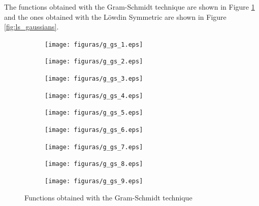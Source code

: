 The functions obtained with the Gram-Schmidt technique are shown in Figure \ref{fig:gs_gaussians} and the ones obtained with the Löwdin Symmetric are shown in Figure \ref{fig:ls_gaussians}.
\begin{figure}[H]
    \centering
    \begin{subfigure}[b]{0.3\linewidth}
        \texttt{[image: figuras/g\_gs\_1.eps]}
    \end{subfigure}
    \begin{subfigure}[b]{0.3\linewidth}
        \texttt{[image: figuras/g\_gs\_2.eps]}
    \end{subfigure}
    \begin{subfigure}[b]{0.3\linewidth}
        \texttt{[image: figuras/g\_gs\_3.eps]}
    \end{subfigure}
    \begin{subfigure}[b]{0.3\linewidth}
        \texttt{[image: figuras/g\_gs\_4.eps]}
    \end{subfigure}
    \begin{subfigure}[b]{0.3\linewidth}
        \texttt{[image: figuras/g\_gs\_5.eps]}
    \end{subfigure}
    \begin{subfigure}[b]{0.3\linewidth}
        \texttt{[image: figuras/g\_gs\_6.eps]}
    \end{subfigure}
    \begin{subfigure}[b]{0.3\linewidth}
        \texttt{[image: figuras/g\_gs\_7.eps]}
    \end{subfigure}
    \begin{subfigure}[b]{0.3\linewidth}
        \texttt{[image: figuras/g\_gs\_8.eps]}
    \end{subfigure}
    \begin{subfigure}[b]{0.3\linewidth}
        \texttt{[image: figuras/g\_gs\_9.eps]}
    \end{subfigure}
    \caption{Functions obtained with the Gram-Schmidt technique}
    \label{fig:gs_gaussians}
\end{figure}


